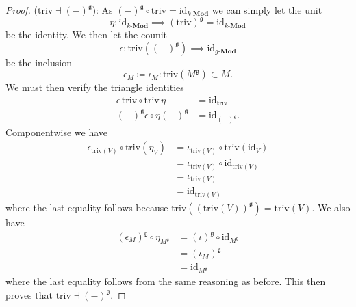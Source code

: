 \begin{proof}
  ($ \text{triv} \dashv (-)^\mathfrak{g} $): As $ (-)^\mathfrak{g} \circ \text{triv} = \text{id}_{k\text{-}\mathbf{Mod}} $ we can simply let the unit
  \begin{equation}
    \eta: \text{id}_{k\text{-}\mathbf{Mod}} \implies (\text{triv})^\mathfrak{g}=\text{id}_{k\text{-}\mathbf{Mod}}
  \end{equation}
  be the identity. We then let the counit
  \begin{equation}
    \epsilon:  \text{triv}((-)^\mathfrak{g}) \implies \text{id}_{g\text{-}\mathbf{Mod}}
  \end{equation}
  be the inclusion
  \begin{equation}
    \epsilon_M \coloneqq \iota_M:\text{triv}(M^\mathfrak{g}) \subset M.
  \end{equation}
  We must then verify the triangle identities
  \begin{align*}
    \epsilon\,\text{triv} \circ \text{triv}\,\eta &= \text{id}_{\text{triv}} \\
    (-)^\mathfrak{g}\epsilon \circ \eta (-)^\mathfrak{g} &= \text{id}_{(-)^\mathfrak{g}}
  .\end{align*}
  Componentwise we have
  \begin{align*}
    \epsilon_{\text{triv}(V)} \circ \text{triv}(\eta_V) &= \iota_{\text{triv}(V)} \circ \text{triv}(\text{id}_V) \\
                                                        &= \iota_{\text{triv}(V)} \circ \text{id}_{\text{triv}(V)} \\
                                                        &= \iota_{\text{triv}(V)} \\
                                                        &= \text{id}_{\text{triv}(V)}
  \end{align*}
  where the last equality follows because $ \text{triv}((\text{triv}(V))^\mathfrak{g}) = \text{triv}(V) $. We also have
  \begin{align*}
    (\epsilon_M)^\mathfrak{g} \circ \eta_{M^\mathfrak{g}} &= (\iota)^\mathfrak{g} \circ \text{id}_{M^\mathfrak{g}} \\
                                                          &= (\iota_M)^\mathfrak{g} \\
                                                          &= \text{id}_{M^\mathfrak{g}}
  \end{align*}
  where the last equality follows from the same reasoning as before. This then proves that $ \text{triv} \dashv (-)^\mathfrak{g} $.
\end{proof}

